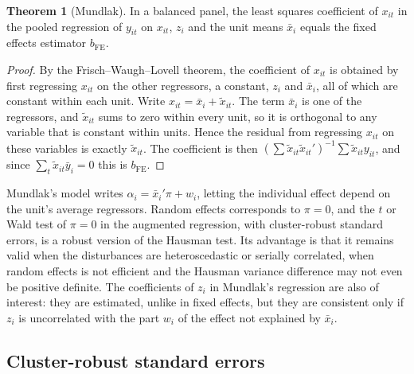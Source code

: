 \documentclass[11pt,a4paper]{article}
\numberwithin{equation}{section}
\theoremstyle{definition}
\newtheorem{thm}{Theorem}[subsection]
\begin{document}
\begin{thm}[Mundlak]
\label{thm:mundlak}
In a balanced panel, the least squares coefficient of $x_{it}$ in the pooled regression of $y_{it}$ on $x_{it}$, $z_i$ and the unit means $\bar x_i$ equals the fixed effects estimator
$b_{\text{FE}}$.
\end{thm}

\begin{proof}
By the Frisch--Waugh--Lovell theorem, the coefficient of $x_{it}$ is obtained by first regressing $x_{it}$ on the other regressors, a constant, $z_i$ and $\bar x_i$, all of which are
constant within each unit. Write $x_{it} = \bar x_i + \tilde x_{it}$. The term $\bar x_i$ is one of the regressors, and $\tilde x_{it}$ sums to zero within every unit, so it is orthogonal to any
variable that is constant within units. Hence the residual from regressing $x_{it}$ on these variables is exactly $\tilde x_{it}$. The coefficient is then
$(\sum\tilde x_{it}\tilde x_{it}')^{-1}\sum\tilde x_{it}y_{it}$, and since $\sum_t\tilde x_{it}\bar y_i = 0$ this is $b_{\text{FE}}$.
\end{proof}

Mundlak's model writes $\alpha_i = \bar x_i'\pi + w_i$, letting the individual effect depend on the unit's average regressors. Random effects corresponds to $\pi = 0$,
and the $t$ or Wald test of $\pi = 0$ in the augmented regression, with cluster-robust standard errors, is a robust version of the Hausman test. Its
advantage is that it remains valid when the disturbances are heteroscedastic or serially correlated, when random effects is not efficient and the
Hausman variance difference may not even be positive definite. The coefficients of $z_i$ in Mundlak's regression are also of interest: they are
estimated, unlike in fixed effects, but they are consistent only if $z_i$ is uncorrelated with the part $w_i$ of the effect not explained by $\bar x_i$.

\subsection{Cluster-robust standard errors}
\label{ssec:cluster}
\end{document}
